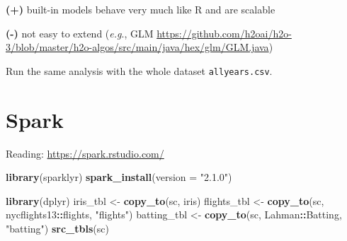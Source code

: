 \documentclass[]{book}
\newenvironment{Shaded}{\begin{snugshade}}{\end{snugshade}}
\newcommand{\KeywordTok}[1]{\textcolor[rgb]{0.13,0.29,0.53}{\textbf{#1}}}
\newcommand{\DataTypeTok}[1]{\textcolor[rgb]{0.13,0.29,0.53}{#1}}
\newcommand{\FloatTok}[1]{\textcolor[rgb]{0.00,0.00,0.81}{#1}}
\newcommand{\StringTok}[1]{\textcolor[rgb]{0.31,0.60,0.02}{#1}}
\newcommand{\OperatorTok}[1]{\textcolor[rgb]{0.81,0.36,0.00}{\textbf{#1}}}
\newcommand{\NormalTok}[1]{#1}
\theoremstyle{definition}
\theoremstyle{definition}
\theoremstyle{definition}
\theoremstyle{remark}
\let\BeginKnitrBlock\begin \let\EndKnitrBlock\end
\begin{document}
\textbf{(+)} built-in models behave very much like R and are scalable

\textbf{(-)} not easy to extend (\emph{e.g}., GLM
\url{https://github.com/h2oai/h2o-3/blob/master/h2o-algos/src/main/java/hex/glm/GLM.java})

\BeginKnitrBlock{exercise}
\protect\hypertarget{exr:unnamed-chunk-134}{}{\label{exr:unnamed-chunk-134}
}Run the same analysis with the whole dataset \texttt{allyears.csv}.
\EndKnitrBlock{exercise}

\section{Spark}\label{spark}

Reading: \url{https://spark.rstudio.com/}

\begin{Shaded}
\begin{Highlighting}[]
\KeywordTok{library}\NormalTok{(sparklyr)}
\KeywordTok{spark_install}\NormalTok{(}\DataTypeTok{version =} \StringTok{"2.1.0"}\NormalTok{)}
\end{Highlighting}
\end{Shaded}

\begin{Shaded}
\end{Shaded}

\begin{Shaded}
\begin{Highlighting}[]
\KeywordTok{library}\NormalTok{(dplyr)}
\NormalTok{iris_tbl <-}\StringTok{ }\KeywordTok{copy_to}\NormalTok{(sc, iris)}
\NormalTok{flights_tbl <-}\StringTok{ }\KeywordTok{copy_to}\NormalTok{(sc, nycflights13}\OperatorTok{::}\NormalTok{flights, }\StringTok{"flights"}\NormalTok{)}
\NormalTok{batting_tbl <-}\StringTok{ }\KeywordTok{copy_to}\NormalTok{(sc, Lahman}\OperatorTok{::}\NormalTok{Batting, }\StringTok{"batting"}\NormalTok{)}
\KeywordTok{src_tbls}\NormalTok{(sc)}
\end{Highlighting}
\end{Shaded}
\end{document}
